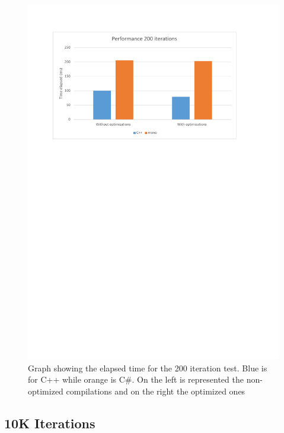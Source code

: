 \begin{figure}[H]\begin{center}
 \centering
  \captionsetup{justification=centering}
  \includegraphics[scale=0.9,page=1]{pictures/performance-tests/GPIO/graphs}
  \caption{Graph showing the elapsed time for the 200 iteration test. Blue is for C++ while orange is C\#. On the left is represented the non-optimized compilations and on the right the optimized ones\label{fig:gpio-graph-200}}
\end{center}\end{figure}

\subsection{10K Iterations}\label{SS:10K-iterations}

